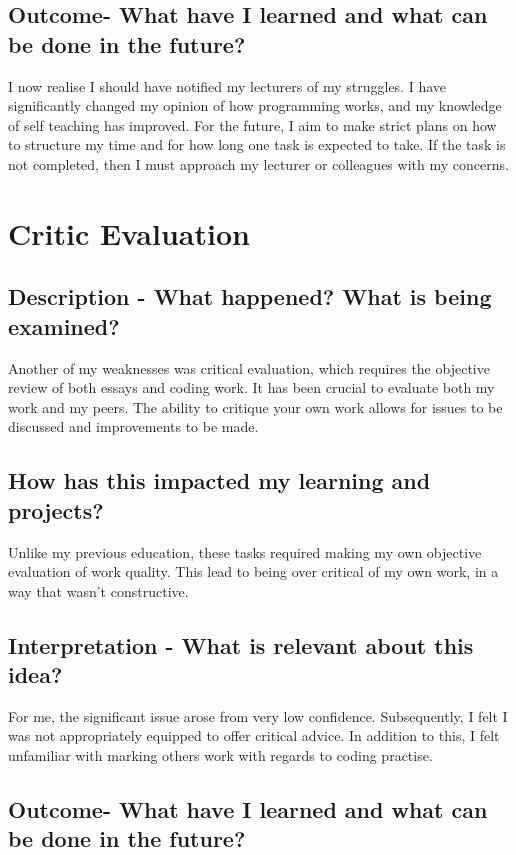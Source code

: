 \documentclass{scrartcl}
\begin{document}
\subsection{Outcome- What have I learned and what can be done in the future?}

I now realise I should have notified my lecturers of my struggles. I have significantly changed my opinion of how programming works, and my knowledge of self teaching has improved. For the future, I aim to make strict plans on how to structure my time and for how long one task is expected to take. If the task is not completed, then I must approach my lecturer or colleagues with my concerns.


\section{Critic Evaluation}

\subsection{Description - What happened? What is being examined?}

Another of my weaknesses was critical evaluation, which requires the objective review of both essays and coding work. It has been crucial to evaluate both my work and my peers. The ability to critique your own work allows for issues to be discussed and improvements to be made.

\subsection{How has this impacted my learning and projects?}

Unlike my previous education, these tasks required making my own objective evaluation of work quality. This lead to being over critical of my own work, in a way that wasn't constructive.

\subsection{Interpretation - What is relevant about this idea?}

For me, the significant issue arose from very low confidence. Subsequently, I felt I was not appropriately equipped to offer critical advice. In addition to this, I felt unfamiliar with marking others work with regards to coding practise.

\subsection{Outcome- What have I learned and what can be done in the future?}
\end{document}
